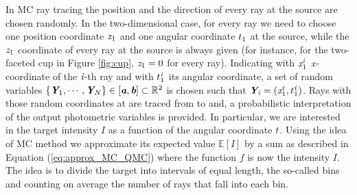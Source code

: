 In MC ray tracing the position and the direction of  every ray at the source are chosen randomly. 
In the two-dimensional case, for every ray we need to choose one position coordinate $\textit{x}_1$ and one angular coordinate $t_1$ at the source, while the $\textit{z}_1$ coordinate of every ray at the source is always given (for instance, for the two-faceted cup in Figure \ref{fig:cup}, $\textit{z}_1=0$ for every ray). 
Indicating with $\textit{x}_{1}^{\textit{i}}$ $\textit{x}$-coordinate of the $\textit{i}$-th ray and with $t_1^{\textit{i}}$ its angular coordinate, a set of random variables $\{\textit{\textbf{Y}}_1, \cdots, \textit{\textbf{Y}}_N\}\in [\textit{\textbf{a}}, \textit{\textbf{b}}]\subset\mathbb{R}^2$ is chosen such that $\textit{\textbf{Y}}_{\textit{i}}= (\textit{x}_{1}^{\textit{i}},t_1^{\textit{i}})$.
Rays with those random coordinates at  are traced from  to  and, a probabilistic interpretation of the output photometric variables is provided.
In particular, we are interested in the target intensity $I$ as a function of the angular coordinate $t$. Using the idea of MC method we approximate its expected value $\mathbb{E}[I]$ by a sum as described in Equation (\ref{eq:approx_MC_QMC}) where the function $f$ is now the intensity $I$.
\\ \indent The idea is to divide the target into intervals of equal length, the so-called bins and counting on average the number  of rays that fall into each bin. 
